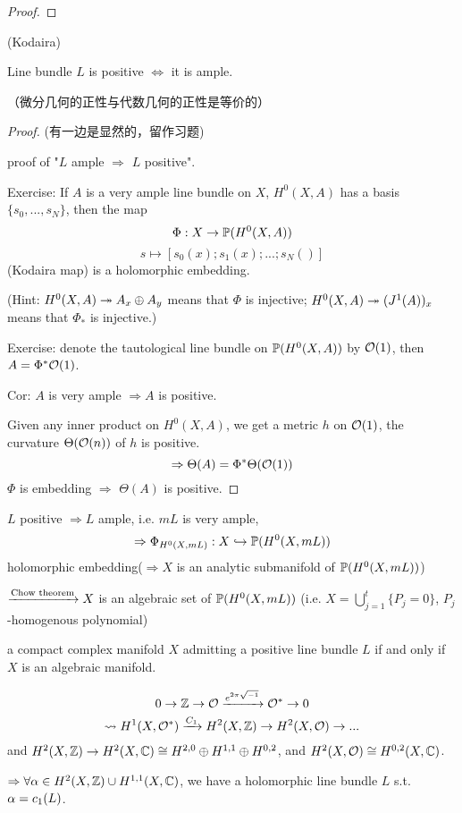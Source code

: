 \begin{proof}
\end{proof}


\begin{thm}(Kodaira)

Line bundle $L$ is positive $\iff$ it is ample.
\end{thm}

（微分几何的正性与代数几何的正性是等价的）

\begin{proof}(有一边是显然的，留作习题)

proof of "$L$ ample $\Rightarrow$ $L$ positive".

Exercise: If $A$ is a very ample line bundle on $X$,
$H^0(X,A)$ has a basis $\{s_0,...,s_N\}$, then the map
$$\Phi:X\to\mathbb{P}(H^0(X,A))$$
$$s\mapsto[s_0(x);s_1(x);...;s_N()]$$
(Kodaira map) is a holomorphic embedding.

(Hint: $H^0(X,A)\twoheadrightarrow A_x\oplus A_y$ means that $\Phi$ is injective;
$H^0(X,A)\twoheadrightarrow(J^1(A))_x$ means that $\Phi_*$ is injective.)

Exercise: denote the tautological line bundle on $\mathbb{P}(H^0(X,A))$
by $\mathcal{O}(1)$, then $A=\Phi^*\mathcal{O}(1)$.

Cor: $A$ is very ample $\Rightarrow A$ is positive.

Given any inner product on $H^0(X,A)$, we get a metric $h$ on $\mathcal{O}(1)$,
the curvature $\Theta(\mathcal{O}(n))$ of $h$ is positive.
$$\Rightarrow\Theta(A)=\Phi^*\Theta(\mathcal{O}(1))$$
$\Phi$ is embedding $\Rightarrow$ $\Theta(A)$ is positive.
\end{proof}

$L$ positive $\Rightarrow L$ ample, i.e. $mL$ is very ample,
$$\Rightarrow\Phi_{H^0(X,mL)}:X\hookrightarrow\mathbb{P}(H^0(X,mL))$$
holomorphic embedding($\Rightarrow X$ is an analytic submanifold of $\mathbb{P}(H^0(X,mL))$)

$\xrightarrow{\text{Chow theorem}}X$ is an algebraic set of $\mathbb{P}(H^0(X,mL))$
(i.e. $X=\bigcup\limits_{j=1}^t\{P_j=0\}$, $P_j$-homogenous polynomial)

a compact complex manifold $X$ admitting a positive line bundle $L$
if and only if $X$ is an algebraic manifold.

$$
  0\to\mathbb{Z}\to\mathcal{O}\xrightarrow{e^{2\pi\sqrt{-1}}}\mathcal{O}^*\to 0
$$
$$\rightsquigarrow
H^1(X,\mathcal{O}^*)\xrightarrow{C_1}H^2(X,\mathbb{Z})\to H^2(X,\mathcal{O})\to...
$$
and $H^2(X,\mathbb{Z})\to H^2(X,\mathbb{C})\cong H^{2,0}\oplus H^{1,1}\oplus H^{0,2}$,
and $H^2(X,\mathcal{O})\cong H^{0,2}(X,\mathbb{C})$.

$\Rightarrow\forall\alpha\in H^2(X,\mathbb{Z})\cup H^{1,1}(X,\mathbb{C})$,
we have a holomorphic line bundle $L$ s.t. $\alpha=c_1(L)$.

